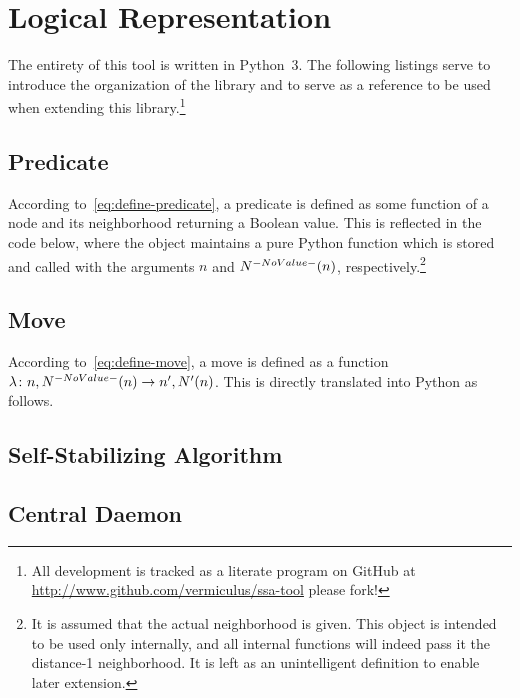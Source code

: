 \section{Logical Representation}
\label{sec:logic-repr}

The entirety of this tool is written in Python~3.
The following listings serve to introduce the organization of the library and
  to serve as a reference to be used when extending this library.\footnote{%
    All development is tracked as a literate program on GitHub
    at \url{http://www.github.com/vermiculus/ssa-tool} \Dash please fork!}

\subsection{Predicate}
\label{sec:logic-repr:predicate}

According to~\eqref{eq:define-predicate},
  a \gls{predicate} is defined as some function of
  a node and its neighborhood returning a Boolean value.
This is reflected in the code below,
  where the  object maintains a pure Python function
  which is stored and called with the arguments $n$ and $\OpenNeighborhood{n}$,
  respectively.\footnote{%
    It is assumed that the actual neighborhood is given.
    This object is intended to be used only internally,
      and all internal functions will indeed pass it the distance-1 neighborhood.
    It is left as an unintelligent definition to enable later extension.}


\subsection{Move}
\label{sec:logic-repr:move}

According to~\eqref{eq:define-move},
  a \gls{move} is defined as a function
  $\Function{n, \OpenNeighborhood{n}}{n^\prime, \OpenNeighborhood[\prime]{n}}$.
This is directly translated into Python as follows.


\subsection{Self-Stabilizing Algorithm}
\label{sec:logic-repr:self-stab-algor}


\subsection{Central Daemon}
\label{sec:logic-repr:daemon}

